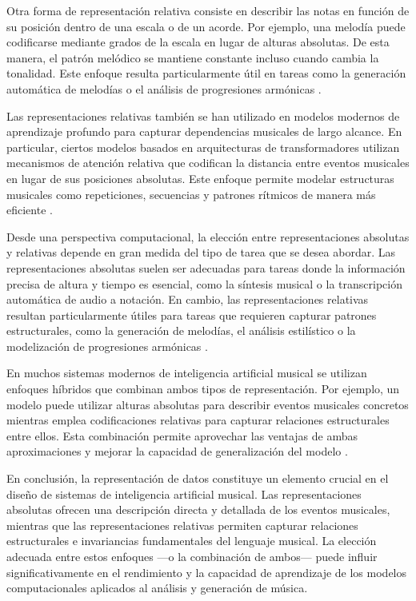\documentclass[12pt]{report}
\begin{document}
Otra forma de representación relativa consiste en describir las notas en función de su posición dentro de una escala o de un acorde. Por ejemplo, una melodía puede codificarse mediante grados de la escala en lugar de alturas absolutas. De esta manera, el patrón melódico se mantiene constante incluso cuando cambia la tonalidad. Este enfoque resulta particularmente útil en tareas como la generación automática de melodías o el análisis de progresiones armónicas \cite{temperley2004bayesian}.

Las representaciones relativas también se han utilizado en modelos modernos de aprendizaje profundo para capturar dependencias musicales de largo alcance. En particular, ciertos modelos basados en arquitecturas de transformadores utilizan mecanismos de atención relativa que codifican la distancia entre eventos musicales en lugar de sus posiciones absolutas. Este enfoque permite modelar estructuras musicales como repeticiones, secuencias y patrones rítmicos de manera más eficiente \cite{shaw2018self}.



Desde una perspectiva computacional, la elección entre representaciones absolutas y relativas depende en gran medida del tipo de tarea que se desea abordar. Las representaciones absolutas suelen ser adecuadas para tareas donde la información precisa de altura y tiempo es esencial, como la síntesis musical o la transcripción automática de audio a notación. En cambio, las representaciones relativas resultan particularmente útiles para tareas que requieren capturar patrones estructurales, como la generación de melodías, el análisis estilístico o la modelización de progresiones armónicas \cite{roberts2018hierarchical}.

En muchos sistemas modernos de inteligencia artificial musical se utilizan enfoques híbridos que combinan ambos tipos de representación. Por ejemplo, un modelo puede utilizar alturas absolutas para describir eventos musicales concretos mientras emplea codificaciones relativas para capturar relaciones estructurales entre ellos. Esta combinación permite aprovechar las ventajas de ambas aproximaciones y mejorar la capacidad de generalización del modelo \cite{wiering2009modeling}.

En conclusión, la representación de datos constituye un elemento crucial en el diseño de sistemas de inteligencia artificial musical. Las representaciones absolutas ofrecen una descripción directa y detallada de los eventos musicales, mientras que las representaciones relativas permiten capturar relaciones estructurales e invariancias fundamentales del lenguaje musical. La elección adecuada entre estos enfoques —o la combinación de ambos— puede influir significativamente en el rendimiento y la capacidad de aprendizaje de los modelos computacionales aplicados al análisis y generación de música.
\end{document}
